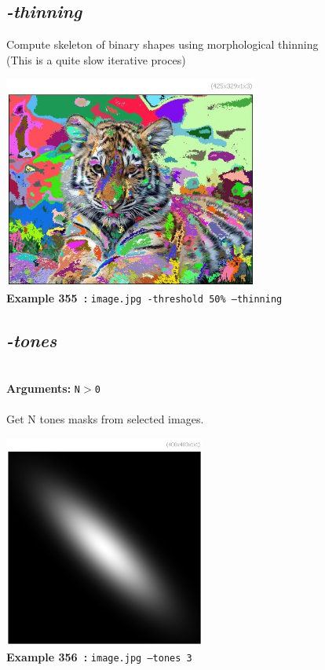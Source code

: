 \documentclass[a4paper,11pt,twoside]{book}
\begin{document}
\subsection{\emph{-thinning} }\vspace*{-0.5em}
Compute skeleton of binary shapes using morphological thinning
~\\(This is a quite slow iterative proces)
\begin{center}\includegraphics[keepaspectratio=true,height=7cm,width=\textwidth]{img/gmic_def355.jpg}\\
{\footnotesize \textbf{Example 355~:} \texttt{image.jpg -threshold 50\% --thinning}}
\end{center}

\subsection{\emph{-tones} }\vspace*{-0.5em}
~\\\textbf{Arguments: } 
{\small \texttt{N$>$0}}\\~\\
Get N tones masks from selected images.
\begin{center}\includegraphics[keepaspectratio=true,height=7cm,width=\textwidth]{img/gmic_def356.jpg}\\
{\footnotesize \textbf{Example 356~:} \texttt{image.jpg --tones 3}}
\end{center}
\end{document}
